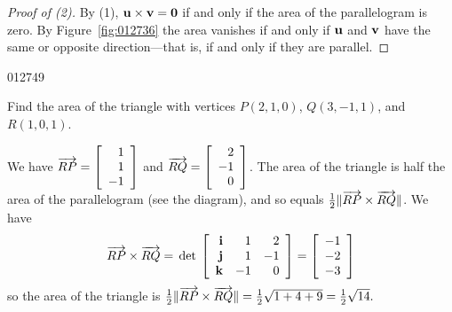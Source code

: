 \begin{proof}[Proof of (2)]
By (1), $\textbf{u} \times \textbf{v} = \textbf{0}$ if and only if the area of the parallelogram is zero. By Figure~\ref{fig:012736} the area vanishes if and only if $\textbf{u}$ and $\textbf{v}$ have the same or opposite direction---that is, if and only if they are parallel.
\end{proof}

\begin{example}{}{012749}

\begin{wrapfigure}[4]{l}{5cm} 
\vspace*{-1em}

\end{wrapfigure}

\setlength{\rightskip}{0pt plus 200pt}
Find the area of the triangle with vertices $P(2, 1, 0)$, $Q(3, -1, 1)$, and $R(1, 0, 1)$.

\begin{solution}
We have 
$\overrightarrow{RP} = \left[
\begin{array}{r}
1\\
1\\
-1
\end{array}
\right]$
 and 
$\overrightarrow{RQ} = \left[
\begin{array}{r}
2\\
-1\\
0
\end{array}
\right]$. The area of the triangle is half the area of the parallelogram (see the diagram), and so equals $\tfrac{1}{2} \| \overrightarrow{RP} \times \overrightarrow{RQ} \|$. We have
\begin{equation*}
\overrightarrow{RP} \times \overrightarrow{RQ} = \thinspace\operatorname{det\medspace}\left[
\begin{array}{rrr}
\textbf{i} & 1 & 2\\
\textbf{j} & 1 & -1\\
\textbf{k} & -1 & 0
\end{array}
\right]
=
\left[
\begin{array}{r}
-1\\
-2\\
-3
\end{array}
\right]
\end{equation*} so the area of the triangle is $\tfrac{1}{2} \| \overrightarrow{RP} \times \overrightarrow{RQ} \| = \tfrac{1}{2}\sqrt{1 + 4 + 9} = \tfrac{1}{2}\sqrt{14}.$

\end{solution}
\end{example}

